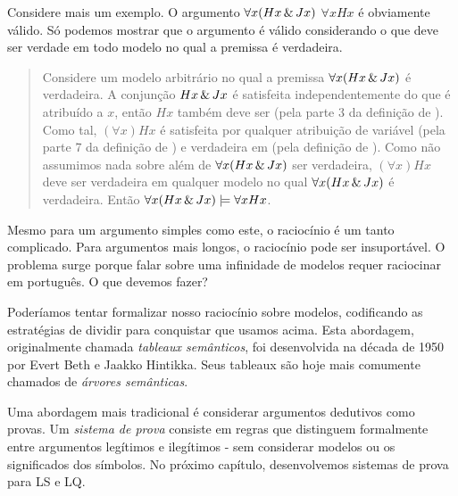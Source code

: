 Considere mais um exemplo. O argumento $\forall x(Hx \,\&\, Jx)$ \therefore  $\forall x Hx$ é obviamente válido. Só podemos mostrar que o argumento é válido considerando o que deve ser verdade em todo modelo no qual a premissa é verdadeira.
\begin{quote}
Considere um modelo arbitrário  no qual a premissa $\forall x(Hx \,\&\, Jx)$ é verdadeira. A conjunção $Hx \,\&\, Jx$ é satisfeita independentemente do que é atribuído a $x$, então $Hx$ também deve ser (pela parte 3 da definição de ). Como tal, $(\forall x) Hx$ é satisfeita por qualquer atribuição de variável (pela parte 7 da definição de ) e verdadeira em  (pela definição de ).
Como não assumimos nada sobre  além de $\forall x(Hx \,\&\, Jx)$ ser verdadeira, $(\forall x) Hx$ deve ser verdadeira em qualquer modelo no qual $\forall x(Hx \,\&\, Jx)$ é verdadeira. Então $\forall x(Hx \,\&\, Jx) \models \forall x Hx$.
\end{quote}
Mesmo para um argumento simples como este, o raciocínio é um tanto complicado. Para argumentos mais longos, o raciocínio pode ser insuportável. O problema surge porque falar sobre uma infinidade de modelos requer raciocinar em português. O que devemos fazer?

Poderíamos tentar formalizar nosso raciocínio sobre modelos, codificando as estratégias de dividir para conquistar que usamos acima. Esta abordagem, originalmente chamada \emph{tableaux semânticos}, foi desenvolvida na década de 1950 por Evert Beth e Jaakko Hintikka. Seus tableaux são hoje mais comumente chamados de \emph{árvores semânticas}.

Uma abordagem mais tradicional é considerar argumentos dedutivos como provas. Um \emph{sistema de prova} consiste em regras que distinguem formalmente entre argumentos legítimos e ilegítimos - sem considerar modelos ou os significados dos símbolos. No próximo capítulo, desenvolvemos sistemas de prova para LS e LQ.

\practiceproblems

